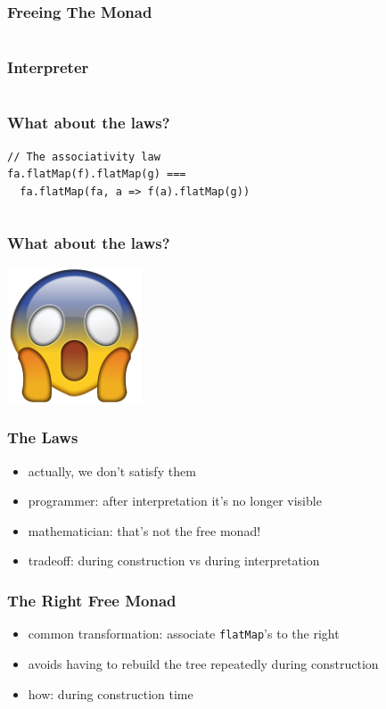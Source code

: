 \documentclass{beamer}
\begin{document}
\begin{frame}[fragile]
  \frametitle{Freeing The Monad}
  \begin{center}
    \inputminted{scala}{snippets/free-instance.scala}
  \end{center}
\end{frame}

\begin{frame}[fragile]
  \frametitle{Interpreter}
  \inputminted{scala}{snippets/free-interp.scala}
\end{frame}

\begin{frame}[fragile]
  \frametitle{What about the laws?}
  \begin{verbatim}
// The associativity law
fa.flatMap(f).flatMap(g) ===
  fa.flatMap(fa, a => f(a).flatMap(g))
  \end{verbatim}
  \vfill{}
  \inputminted[autogobble]{scala}{snippets/what-about-laws.scala}
\end{frame}

\begin{frame}[fragile]
  \frametitle{What about the laws?}
  \begin{center}
    \includegraphics[width=0.3\textwidth]{static-images/scream.png}
  \end{center}
\end{frame}

\begin{frame}[fragile]
  \frametitle{The Laws}
  \begin{itemize}
  \item actually, we don't satisfy them
  \item programmer: after interpretation it's no longer visible
  \item mathematician: that's not the free monad!
  \item tradeoff: during construction vs during interpretation
  \end{itemize}
\end{frame}

\begin{frame}[fragile]
  \frametitle{The Right Free Monad}
  \begin{itemize}
  \item common transformation: associate \texttt{flatMap}'s to the right
  \item avoids having to rebuild the tree repeatedly during construction
  \item how: during construction time
  \end{itemize}
\end{frame}
\end{document}
